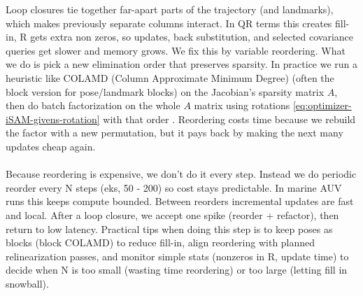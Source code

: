 Loop closures tie together far-apart parts of the trajectory (and landmarks), which makes previously separate columns interact. In QR terms this creates fill-in, R gets extra non zeros, so updates, back substitution, and selected covariance queries get slower and memory grows. We fix this by variable reordering. What we do is pick a new elimination order that preserves sparsity. In practice we run a heuristic like \gls{COLAMD} (Column Approximate Minimum Degree) (often the block version for pose/landmark blocks) on the Jacobian's sparsity matrix $A$, then do batch factorization on the whole $A$ matrix using rotations \eqref{eq:optimizer-iSAM-givens-rotation} with that order \cite{iSAM_paper}. Reordering costs time because we rebuild the factor with a new permutation, but it pays back by making the next many updates cheap again.
\\ \\
Because reordering is expensive, we don't do it every step. Instead we do periodic reorder every N steps (eks, 50 - 200) so cost stays predictable. In marine \gls{AUV} runs this keeps compute bounded. Between reorders incremental updates are fast and local. After a loop closure, we accept one spike (reorder + refactor), then return to low latency. Practical tips when doing this step is to keep poses as blocks (block \gls{COLAMD}) to reduce fill-in, align reordering with planned relinearization passes, and monitor simple stats (nonzeros in R, update time) to decide when N is too small (wasting time reordering) or too large (letting fill in snowball).  



